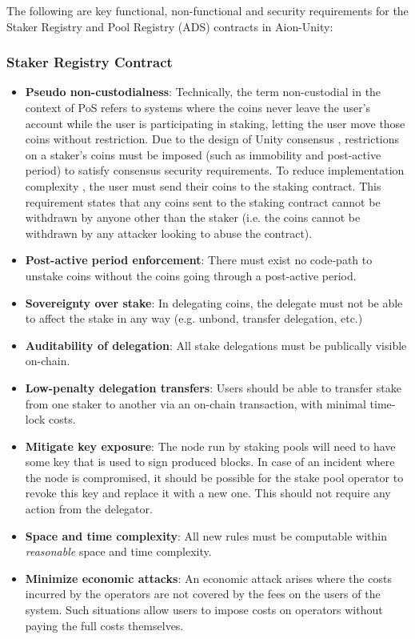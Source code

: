 The following are key functional, non-functional and security requirements for the Staker Registry and Pool Registry (ADS) contracts in Aion-Unity:

\subsubsection{Staker Registry Contract}
\begin{itemize}
    \item \textbf{Pseudo non-custodialness}: Technically, the term non-custodial in the context of PoS refers to systems where the coins never leave the user's account while the user is participating in staking, letting the user move those coins without restriction. Due to the design of Unity consensus \cite{WZS19}, restrictions on a staker's coins must be imposed (such as immobility and post-active period) to satisfy consensus security requirements. To reduce implementation complexity \cite{ZZW19}, the user must send their coins to the staking contract. This requirement states that any coins sent to the staking contract cannot be withdrawn by anyone other than the staker (i.e. the coins cannot be withdrawn by any attacker looking to abuse the contract).
    \item \textbf{Post-active period enforcement}: There must exist no code-path to unstake coins without the coins going through a post-active period. 
    \item \textbf{Sovereignty over stake}: In delegating coins, the delegate must not be able to affect the stake in any way (e.g. unbond, transfer delegation, etc.) 
    \item \textbf{Auditability of delegation}: All stake delegations must be publically visible on-chain. 
    \item \textbf{Low-penalty delegation transfers}: Users should be able to transfer stake from one staker to another via an on-chain transaction, with minimal time-lock costs.
    \item \textbf{Mitigate key exposure}: The node run by staking pools will need to have some key that is used to sign produced blocks. In case of an incident where the node is compromised, it should be possible for the stake pool operator to revoke this key and replace it with a new one. This should not require any action from the delegator. 
    \item \textbf{Space and time complexity}: All new rules must be computable within \textit{reasonable} space and time complexity. 
    \item \textbf{Minimize economic attacks}: An economic attack arises where the costs incurred by the operators are not covered by the fees on the users of the system. Such situations allow users to impose costs on operators without paying the full costs themselves.
\end{itemize}

